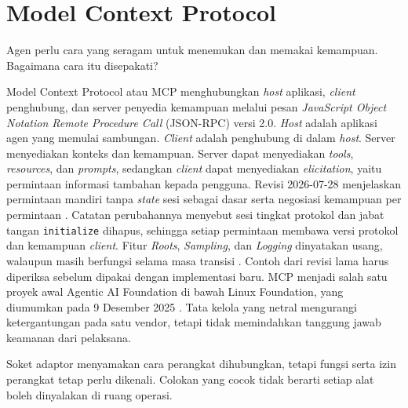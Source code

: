 \section{Model Context Protocol}

Agen perlu cara yang seragam untuk menemukan dan memakai kemampuan. Bagaimana cara itu disepakati?

Model Context Protocol atau MCP menghubungkan \textit{host} aplikasi, \textit{client} penghubung, dan server penyedia kemampuan melalui pesan
\textit{JavaScript Object Notation Remote Procedure Call} (JSON-RPC) versi 2.0. \textit{Host} adalah aplikasi agen yang memulai sambungan. \textit{Client}
adalah penghubung di dalam \textit{host}. Server menyediakan konteks dan kemampuan. Server dapat menyediakan \textit{tools}, \textit{resources}, dan
\textit{prompts}, sedangkan \textit{client} dapat menyediakan \textit{elicitation}, yaitu permintaan informasi tambahan kepada pengguna. Revisi 2026-07-28
menjelaskan permintaan mandiri tanpa \textit{state} sesi sebagai dasar serta negosiasi kemampuan per permintaan \cite{mcp2026}. Catatan perubahannya menyebut sesi
tingkat protokol dan jabat tangan \texttt{initialize} dihapus, sehingga setiap permintaan membawa versi protokol dan kemampuan \textit{client}. Fitur
\textit{Roots}, \textit{Sampling}, dan \textit{Logging} dinyatakan usang, walaupun masih berfungsi selama masa transisi \cite{c14-mcp-changelog}. Contoh
dari revisi lama harus diperiksa sebelum dipakai dengan implementasi baru. MCP menjadi salah satu proyek awal Agentic AI Foundation di bawah Linux
Foundation, yang diumumkan pada 9 Desember 2025 \cite{c14-aaif}. Tata kelola yang netral mengurangi ketergantungan pada satu vendor, tetapi tidak
memindahkan tanggung jawab keamanan dari pelaksana.

Soket adaptor menyamakan cara perangkat dihubungkan, tetapi fungsi serta izin perangkat tetap perlu dikenali. Colokan yang cocok tidak berarti setiap alat
boleh dinyalakan di ruang operasi.

